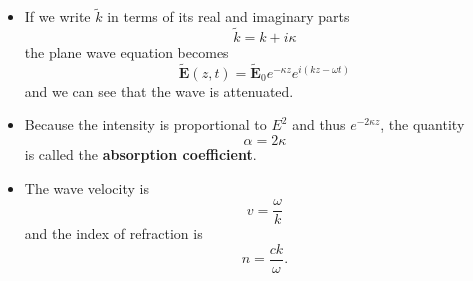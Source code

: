 \documentclass{article}
\renewcommand{\vec}[1]{\boldsymbol{\mathbf{#1}}}
\newcommand{\tvec}[1]{\tilde{\vec{#1}}}
\begin{document}
\begin{itemize}
  \item If we write $\tilde{k}$ in terms of its real and imaginary parts \[\tilde{k} = k + i \kappa\] the plane wave equation becomes \[\tvec{E}(z, t) = \tvec{E}_0 e^{-\kappa z} e^{i (k z - \omega t)}\] and we can see that the wave is attenuated.

  \item Because the intensity is proportional to $E^2$ and thus $e^{-2 \kappa z}$, the quantity \[\alpha = 2 \kappa\] is called the \textbf{absorption coefficient}.

  \item The wave velocity is \[v = \frac{\omega}{k}\] and the index of refraction is \[n = \frac{c k}{\omega}.\]
\end{itemize}
\end{document}
